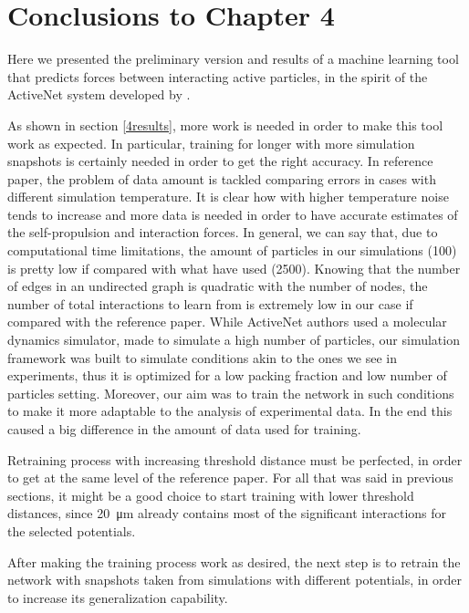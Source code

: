 \documentclass[../../master_thesis_np.tex]{subfiles}
\begin{document}
\section{Conclusions to Chapter 4}

Here we presented the preliminary version and results of a machine learning tool that predicts forces between interacting active particles, in the spirit of the ActiveNet system developed by \citeauthor{ruiz-garcia_discovering_2024}.

As shown in section \ref{4results}, more work is needed in order to make this tool work as expected.
In particular, training for longer with more simulation snapshots is certainly needed in order to get the right accuracy.
In reference paper, the problem of data amount is tackled comparing errors in cases with different simulation temperature.
It is clear how with higher temperature noise tends to increase and more data is needed in order to have accurate estimates of the self-propulsion and interaction forces.
In general, we can say that, due to computational time limitations, the amount of particles in our simulations (100) is pretty low if compared with what \citeauthor{ruiz-garcia_discovering_2024} have used (2500).
Knowing that the number of edges in an undirected graph is quadratic with the number of nodes, the number of total interactions to learn from is extremely low in our case if compared with the reference paper.
While ActiveNet authors used a molecular dynamics simulator, made to simulate a high number of particles, our simulation framework was built to simulate conditions akin to the ones we see in experiments, thus it is optimized for a low packing fraction and low number of particles setting.
Moreover, our aim was to train the network in such conditions to make it more adaptable to the analysis of experimental data.
In the end this caused a big difference in the amount of data used for training.

Retraining process with increasing threshold distance must be perfected, in order to get at the same level of the reference paper.
For all that was said in previous sections, it might be a good choice to start training with lower threshold distances, since \SI{20}{\um} already contains most of the significant interactions for the selected potentials. 

After making the training process work as desired, the next step is to retrain the network with snapshots taken from simulations with different potentials, in order to increase its generalization capability.
\end{document}
